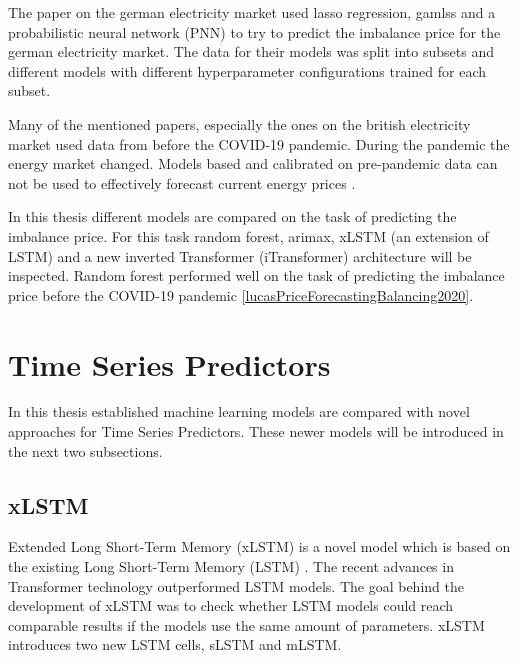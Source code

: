 \documentclass[class=scrbook, crop=false]{standalone}
\begin{document}
The paper on the german electricity market \cite{narajewskiProbabilisticForecastingGerman2022} used lasso regression, gamlss and a probabilistic neural network (PNN) to try to predict the imbalance price for the german electricity market. The data for their models was split into subsets and different models with different hyperparameter configurations trained for each subset.

Many of the mentioned papers, especially the ones on the british electricity market used data from before the COVID-19 pandemic. During the pandemic the energy market changed. Models based and calibrated on pre-pandemic data can not be used to effectively forecast current energy prices \cite{abadieEnergyMarketPrices2021}.


In this thesis different models are compared on the task of predicting the imbalance price. 
For this task random forest, arimax, xLSTM (an extension of LSTM) \cite{beckXLSTMExtendedLong2024} and a new inverted Transformer (iTransformer) \cite{liuITransformerInvertedTransformers2023} architecture will be inspected.
Random forest performed well on the task of predicting the imbalance price before the COVID-19 pandemic \ref{lucasPriceForecastingBalancing2020}.


\section{Time Series Predictors}
\label{Section::Time_Series_Predictors}

In this thesis established machine learning models are compared with novel approaches for Time Series Predictors. These newer models will be introduced in the next two subsections.




\subsection{xLSTM}
\label{Section::xLSTM}
Extended Long Short-Term Memory (xLSTM) is a novel model which is based on the existing Long Short-Term Memory (LSTM) \cite{gravesLongShortTermMemory2012}. The recent advances in Transformer technology outperformed LSTM models. 
The goal behind the development of xLSTM was to check whether LSTM models could reach comparable results if the models use the same amount of parameters.
xLSTM introduces two new LSTM cells, sLSTM and mLSTM.
\end{document}
